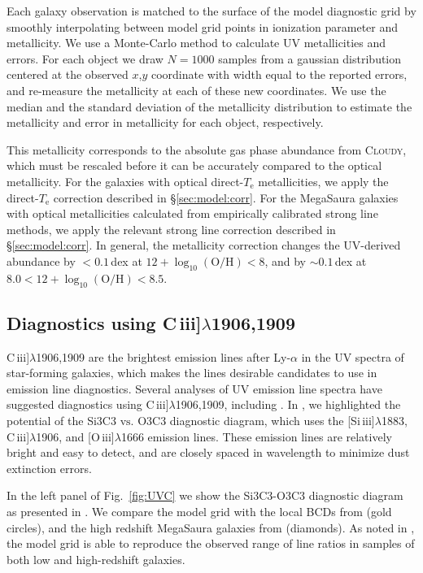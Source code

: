 \documentclass[preprint2]{aastex62}
\newcommand{\Cloudy}{\textsc{Cloudy}\xspace}
\newcommand{\oiii}{[O\,{\sc iii}]\xspace}
\newcommand{\SiuIII}{[Si\,{\sc iii}]\xspace}
\newcommand{\ciii}{C\,{\sc iii}]\xspace}
\newcommand\vs{\ensuremath{\mathrm{vs.}}\xspace}
\newcommand{\logten}{\ensuremath{\log_{10}}}
\newcommand{\logOH}{\ensuremath{\logten (\mathrm{O}/\mathrm{H})}\xspace}
\newcommand{\mage}{{\sc Meg}a{\sc S}a{\sc ura}\xspace}
\newcommand{\Te}{\ensuremath{T_{\mathrm{e}}}\xspace}
\begin{document}
Each galaxy observation is matched to the surface of the model diagnostic grid by smoothly interpolating between model grid points in ionization parameter and metallicity. We use a Monte-Carlo method to calculate UV metallicities and errors. For each object we draw $N=1000$ samples from a gaussian distribution centered at the observed $x$,$y$ coordinate with width equal to the reported errors, and re-measure the metallicity at each of these new coordinates. We use the median and the standard deviation of the metallicity distribution to estimate the metallicity and error in metallicity for each object, respectively. 

This metallicity corresponds to the absolute gas phase abundance from \Cloudy, which must be rescaled before it can be accurately compared to the optical metallicity. For the \citet{Berg+2016} galaxies with optical direct-\Te metallicities, we apply the direct-\Te correction described in \S\ref{sec:model:corr}. For the \mage galaxies with optical metallicities calculated from empirically calibrated strong line methods, we apply the relevant strong line correction described in \S\ref{sec:model:corr}. In general, the metallicity correction changes the UV-derived abundance by $<0.1$\,dex at $12 + \logOH < 8$, and by ${\sim}0.1$\,dex at $8.0 < 12 + \logOH < 8.5$.

\subsection{Diagnostics using \ciii$\lambda$1906,1909}\label{sec:UVOpt:C}

\ciii$\lambda$1906,1909 are the brightest emission lines after Ly-$\alpha$ in the UV spectra of star-forming galaxies, which makes the lines desirable candidates to use in emission line diagnostics. Several analyses of UV emission line spectra have suggested diagnostics using \ciii$\lambda$1906,1909, including \citet{Feltre+2016, Jaskot+2016, Byler+2018}. In \citet{Byler+2018}, we highlighted the potential of the Si3C3 \vs O3C3 diagnostic diagram, which uses the \SiuIII$\lambda$1883, \ciii$\lambda$1906, and \oiii$\lambda$1666 emission lines. These emission lines are relatively bright and easy to detect, and are closely spaced in wavelength to minimize dust extinction errors. 

In the left panel of Fig.~\ref{fig:UVC} we show the Si3C3-O3C3 diagnostic diagram as presented in \citet{Byler+2018}. We compare the model grid with the local BCDs from \citet{Berg+2016} (gold circles), and the high redshift \mage galaxies from \citet{Rigby+2018b} (diamonds). As noted in \citet{Byler+2018}, the model grid is able to reproduce the observed range of line ratios in samples of both low and high-redshift galaxies.
\end{document}
